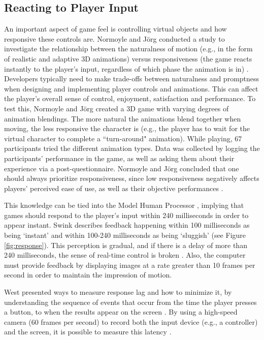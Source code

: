 \subsection{Reacting to Player Input}
An important aspect of game feel is controlling virtual objects and how responsive these controls are. Normoyle and J\"{o}rg conducted a study to investigate the relationship between the naturalness of motion (e.g., in the form of realistic and adaptive 3D animations) versus responsiveness (the game reacts instantly to the player's input, regardless of which phase the animation is in) \cite{normoyle_trade-offs_2014}. Developers typically need to make trade-offs between naturalness and promptness when designing and implementing player controls and animations. This can affect the player's overall sense of control, enjoyment, satisfaction and performance. To test this, Normoyle and J\"{o}rg  created a 3D game with varying degrees of animation blendings. The more natural the animations blend together when moving, the less responsive the character is (e.g., the player has to wait for the virtual character to complete a ``turn-around" animation). While playing, 67 participants tried the different animation types.  Data was collected by logging the participants' performance in the game, as well as asking them about their experience via a post-questionnaire. Normoyle and J\"{o}rg concluded that one should always prioritize responsiveness, since low responsiveness negatively affects players' perceived ease of use, as well as their objective performances \cite{normoyle_trade-offs_2014}.

This knowledge can be tied into the Model Human Processor \cite{card1986model, swink}, implying that games should respond to the player's input within 240 milliseconds in order to appear instant. Swink describes feedback happening within 100 milliseconds as being `instant' and within 100-240 milliseconds as being `sluggish' (see Figure \ref{fig:response}). This perception is gradual, and if there is a delay of more than 240 milliseconds, the sense of real-time control is broken \cite{swink}. Also, the computer must provide feedback by displaying images at a rate greater than 10 frames per second in order to maintain the impression of motion.

West presented ways to measure response lag and how to minimize it, by understanding the sequence of events that occur from the time the player presses a button, to when the results appear on the screen \cite{measure_lag, program_lag}. By using a high-speed camera (60 frames per second) to record both the input device (e.g., a controller) and the screen, it is possible to measure this latency \cite{euro}.

